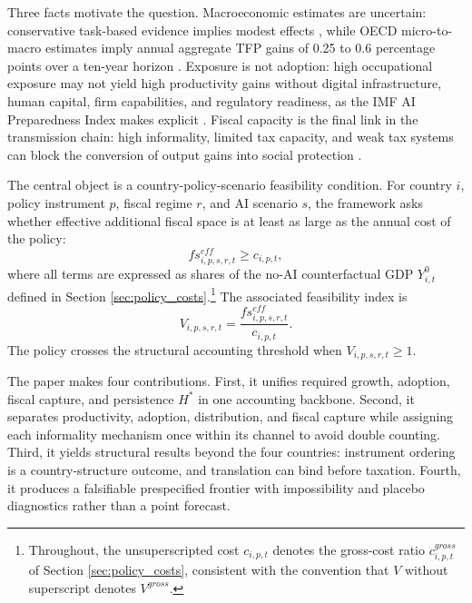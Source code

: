 \documentclass[11pt,a4paper]{article}
\begin{document}
Three facts motivate the question. Macroeconomic estimates are uncertain: conservative task-based evidence implies modest effects \citep{acemoglu2024simple}, while OECD micro-to-macro estimates imply annual aggregate TFP gains of 0.25 to 0.6 percentage points over a ten-year horizon \citep{filippucci2024miracle}. Exposure is not adoption: high occupational exposure may not yield high productivity gains without digital infrastructure, human capital, firm capabilities, and regulatory readiness, as the IMF AI Preparedness Index makes explicit \citep{cazzaniga2024genai}. Fiscal capacity is the final link in the transmission chain: high informality, limited tax capacity, and weak tax systems can block the conversion of output gains into social protection \citep{gaspar2016tax}.

The central object is a country-policy-scenario feasibility condition. For country $i$, policy instrument $p$, fiscal regime $r$, and AI scenario $s$, the framework asks whether effective additional fiscal space is at least as large as the annual cost of the policy:
\begin{equation}
    fs^{eff}_{i,p,s,r,t} \geq c_{i,p,t},
\end{equation}
where all terms are expressed as shares of the no-AI counterfactual GDP $Y^0_{i,t}$ defined in Section \ref{sec:policy_costs}.\footnote{Throughout, the unsuperscripted cost $c_{i,p,t}$ denotes the gross-cost ratio $c^{gross}_{i,p,t}$ of Section \ref{sec:policy_costs}, consistent with the convention that $V$ without superscript denotes $V^{gross}$.} The associated feasibility index is
\begin{equation}
    V_{i,p,s,r,t}=\frac{fs^{eff}_{i,p,s,r,t}}{c_{i,p,t}}.
\end{equation}
The policy crosses the structural accounting threshold when $V_{i,p,s,r,t}\geq 1$.

The paper makes four contributions. First, it unifies required growth, adoption, fiscal capture, and persistence $H^*$ in one accounting backbone. Second, it separates productivity, adoption, distribution, and fiscal capture while assigning each informality mechanism once within its channel to avoid double counting. Third, it yields structural results beyond the four countries: instrument ordering is a country-structure outcome, and translation can bind before taxation. Fourth, it produces a falsifiable prespecified frontier with impossibility and placebo diagnostics rather than a point forecast.
\end{document}
